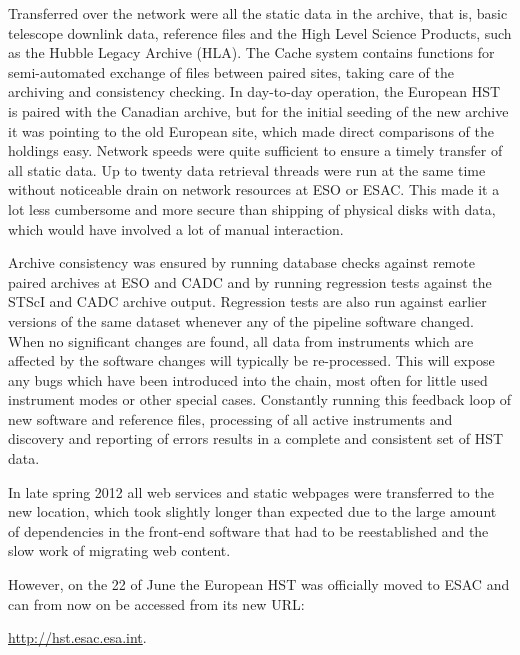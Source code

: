 Transferred over the network were all the static data in the archive, that is, basic telescope downlink data, reference files and the High Level Science Products, such as the Hubble Legacy Archive (HLA). The  Cache system contains functions for semi-automated exchange of files between paired sites, taking care of the archiving and consistency checking. In day-to-day operation, the European HST is paired with the Canadian archive, but for the initial seeding of the new archive  it was pointing to the old European site, which made direct comparisons of the holdings easy. Network speeds were quite sufficient to ensure a timely transfer of all static data. Up to twenty data retrieval threads were run at the same time without noticeable drain on network resources at ESO or ESAC. This made it a lot less cumbersome and more secure than shipping of physical disks with data, which would have involved a lot of manual interaction.

Archive consistency was  ensured by running database checks against remote paired archives at ESO and CADC and by running regression tests against the STScI and CADC archive output. Regression tests are also run against earlier versions of the same dataset whenever any of the pipeline software changed. When no significant changes are found, all data from instruments which are affected by the software changes will typically be re-processed. This will expose any bugs which have been introduced into the chain, most often for little used instrument modes or other special cases. Constantly  running this feedback loop of new software and reference files, processing of all active instruments and discovery and reporting of errors results in a complete and consistent set of HST data. 

In late spring 2012 all web services and static webpages were transferred to the new location, which took slightly longer than expected due to the large amount of dependencies in the front-end software that had to be reestablished and the slow work of migrating web content.

However, on the 22 of June the European HST was officially moved to ESAC and can from now on be accessed from its new URL: 

 \url{http://hst.esac.esa.int}.

